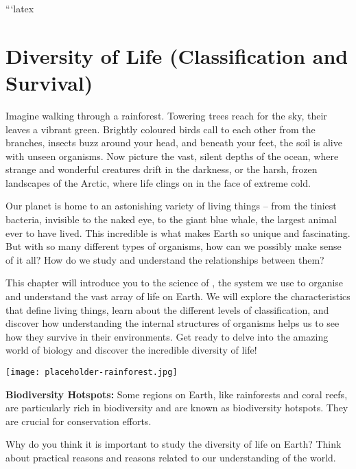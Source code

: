 ```latex
\chapter{Diversity of Life (Classification and Survival)}

\FloatBarrier

Imagine walking through a rainforest. Towering trees reach for the sky, their leaves a vibrant green. Brightly coloured birds call to each other from the branches, insects buzz around your head, and beneath your feet, the soil is alive with unseen organisms. Now picture the vast, silent depths of the ocean, where strange and wonderful creatures drift in the darkness, or the harsh, frozen landscapes of the Arctic, where life clings on in the face of extreme cold.

Our planet is home to an astonishing variety of living things – from the tiniest bacteria, invisible to the naked eye, to the giant blue whale, the largest animal ever to have lived. This incredible  is what makes Earth so unique and fascinating.  But with so many different types of organisms, how can we possibly make sense of it all? How do we study and understand the relationships between them?

This chapter will introduce you to the science of , the system we use to organise and understand the vast array of life on Earth. We will explore the characteristics that define living things, learn about the different levels of classification, and discover how understanding the internal structures of organisms helps us to see how they survive in their environments.  Get ready to delve into the amazing world of biology and discover the incredible diversity of life!

\begin{marginfigure}
\texttt{[image: placeholder-rainforest.jpg]}
\end{marginfigure}

\begin{marginnote}
\textbf{Biodiversity Hotspots:} Some regions on Earth, like rainforests and coral reefs, are particularly rich in biodiversity and are known as biodiversity hotspots. They are crucial for conservation efforts.
\end{marginnote}

\begin{stopandthink}
Why do you think it is important to study the diversity of life on Earth?  Think about practical reasons and reasons related to our understanding of the world.
\end{stopandthink}


